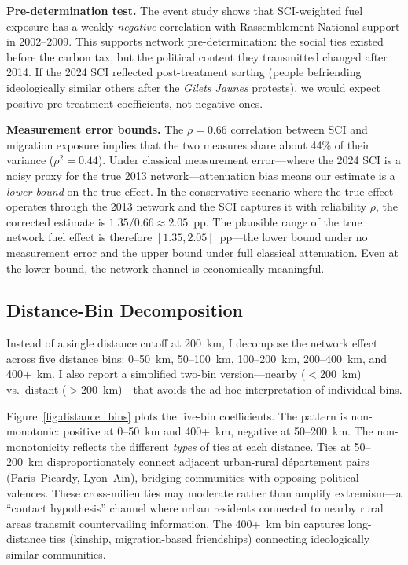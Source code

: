 \documentclass[12pt]{article}
\newcommand{\rn}{Rassemblement National}
\newcommand{\gj}{\textit{Gilets Jaunes}}
\newcommand{\dept}{d\'{e}partement}
\begin{document}
\textbf{Pre-determination test.} The event study shows that SCI-weighted fuel exposure has a weakly \emph{negative} correlation with \rn{} support in 2002--2009. This supports network pre-determination: the social ties existed before the carbon tax, but the political content they transmitted changed after 2014. If the 2024 SCI reflected post-treatment sorting (people befriending ideologically similar others after the \gj{} protests), we would expect positive pre-treatment coefficients, not negative ones.

\textbf{Measurement error bounds.} The $\rho = 0.66$ correlation between SCI and migration exposure implies that the two measures share about 44\% of their variance ($\rho^2 = 0.44$). Under classical measurement error---where the 2024 SCI is a noisy proxy for the true 2013 network---attenuation bias means our estimate is a \emph{lower bound} on the true effect. In the conservative scenario where the true effect operates through the 2013 network and the SCI captures it with reliability $\rho$, the corrected estimate is $1.35 / 0.66 \approx 2.05$~pp. The plausible range of the true network fuel effect is therefore $[1.35, 2.05]$~pp---the lower bound under no measurement error and the upper bound under full classical attenuation. Even at the lower bound, the network channel is economically meaningful.

\subsection{Distance-Bin Decomposition}

Instead of a single distance cutoff at 200~km, I decompose the network effect across five distance bins: 0--50~km, 50--100~km, 100--200~km, 200--400~km, and 400+~km. I also report a simplified two-bin version---nearby ($<$200~km) vs.\ distant ($>$200~km)---that avoids the ad hoc interpretation of individual bins.

Figure~\ref{fig:distance_bins} plots the five-bin coefficients. The pattern is non-monotonic: positive at 0--50~km and 400+~km, negative at 50--200~km. The non-monotonicity reflects the different \emph{types} of ties at each distance. Ties at 50--200~km disproportionately connect adjacent urban-rural \dept{} pairs (Paris--Picardy, Lyon--Ain), bridging communities with opposing political valences. These cross-milieu ties may moderate rather than amplify extremism---a ``contact hypothesis'' channel where urban residents connected to nearby rural areas transmit countervailing information. The 400+~km bin captures long-distance ties (kinship, migration-based friendships) connecting ideologically similar communities.
\end{document}
